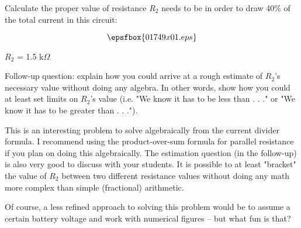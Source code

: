 

Calculate the proper value of resistance $R_2$ needs to be in order to draw 40\% of the total current in this circuit:

$$\epsfbox{01749x01.eps}$$







$R_2$ = 1.5 k$\Omega$

\vskip 10pt

Follow-up question: explain how you could arrive at a rough estimate of $R_2$'s necessary value without doing any algebra.  In other words, show how you could at least set limits on $R_2$'s value (i.e. "We know it has to be less than . . ." or "We know it has to be greater than . . .").







This is an interesting problem to solve algebraically from the current divider formula.  I recommend using the product-over-sum formula for parallel resistance if you plan on doing this algebraically.  The estimation question (in the follow-up) is also very good to discuss with your students.  It is possible to at least "bracket" the value of $R_2$ between two different resistance values without doing any math more complex than simple (fractional) arithmetic.

Of course, a less refined approach to solving this problem would be to assume a certain battery voltage and work with numerical figures -- but what fun is that?





